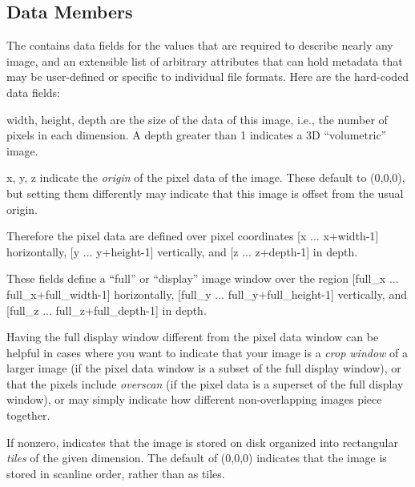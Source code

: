 \subsection{\ImageSpec Data Members}

The \ImageSpec contains data fields for the values that are
required to describe nearly any image, and an extensible list of
arbitrary attributes that can hold metadata that may be user-defined or
specific to individual file formats.  Here are the hard-coded data
fields:


{\cf width, height, depth} are the size of the data of this image, i.e.,
the number of pixels in each dimension.  A {\cf depth} greater than 1
indicates a 3D ``volumetric'' image.

{\cf x, y, z} indicate the \emph{origin} of the pixel data of the image.
These default to (0,0,0), but setting them differently may indicate that
this image is offset from the usual origin.

Therefore the pixel data are defined over pixel coordinates
[{\cf x} ... {\cf x+width-1}] horizontally, 
[{\cf y} ... {\cf y+height-1}] vertically, 
and [{\cf z} ... {\cf z+depth-1}] in depth.
\apiend


These fields define a ``full'' or ``display'' image window over the
region [{\cf full_x} ... {\cf full_x+full_width-1}] horizontally, 
[{\cf full_y} ... {\cf full_y+full_height-1}] vertically, 
and [{\cf full_z} ... {\cf full_z+full_depth-1}] in depth.

Having the full display window different from the pixel data window can
be helpful in cases where you want to indicate that your image is a
\emph{crop window} of a larger image (if the pixel data window is a
subset of the full display window), or that the pixels include
\emph{overscan} (if the pixel data is a superset of the full display
window), or may simply indicate how different non-overlapping images
piece together.
\apiend

If nonzero, indicates that the image is stored on disk organized into
rectangular \emph{tiles} of the given dimension.  The default of 
(0,0,0) indicates that the image is stored in scanline order, rather
than as tiles.
\apiend

